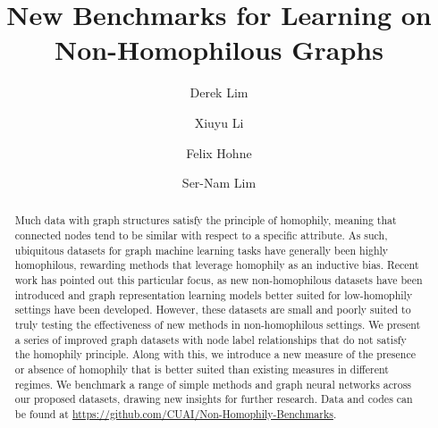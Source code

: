 \documentclass[sigconf, balance=false]{acmart}
\begin{document}
\title{New Benchmarks for Learning on Non-Homophilous Graphs}

\author{Derek Lim}

\author{Xiuyu Li}
\authornotemark[1]

\author{Felix Hohne}
\authornotemark[1]
  
\author{Ser-Nam Lim}




\begin{abstract}
Much data with graph structures satisfy the principle of homophily, meaning that connected nodes tend to be similar with respect to a specific attribute. As such, ubiquitous datasets for graph machine learning tasks have generally been highly homophilous, rewarding methods that leverage homophily as an inductive bias. Recent work has pointed out this particular focus, as new non-homophilous datasets have been introduced and graph representation learning models better suited for low-homophily settings have been developed. However, these datasets are small and poorly suited to truly testing the effectiveness of new methods in non-homophilous settings. We present a series of improved graph datasets with node label relationships that do not satisfy the homophily principle. Along with this, we introduce a new measure of the presence or absence of homophily that is better suited than existing measures in different regimes. We benchmark a range of simple methods and graph neural networks across our proposed datasets, drawing new insights for further research. Data and codes can be found at \href{https://github.com/CUAI/Non-Homophily-Benchmarks}{\color[HTML]{395dc0}https://github.com/CUAI/Non-Homophily-Benchmarks}.
\end{abstract}







\maketitle
\end{document}
